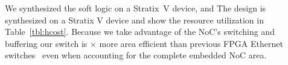We synthesized the soft logic on a Stratix~V device, and
The design is synthesized on a Stratix V device and show the resource utilization in Table~\ref{tbl:hcost}.
Because we take advantage of the NoC's switching and buffering our switch is $\times$ more area efficient than previous FPGA Ethernet switches~\cite{dai-zhu} even when accounting for the complete embedded NoC area.



%
%
%



